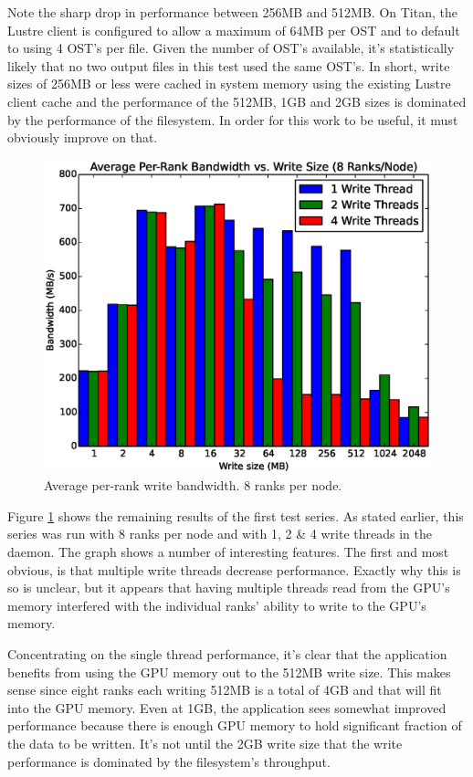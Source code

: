 Note the sharp drop in performance between 256MB and 512MB.  On Titan, the Lustre client is configured to allow a maximum of 64MB per OST and to default to using 4 OST's per file.  Given the number of OST's available, it's statistically likely that no two output files in this test used the same OST's.  In short, write sizes of 256MB or less were cached in system memory using the existing Lustre client cache and the performance of the 512MB, 1GB and 2GB sizes is dominated by the performance of the filesystem.  In order for this work to be useful, it must obviously improve on that.

\begin{figure}
\includegraphics[width=\linewidth]{figures/figure_2.eps}
\caption{Average per-rank write bandwidth.  8 ranks per node.} 
\label{fig:results_8_nobars}
\end{figure}

Figure \ref{fig:results_8_nobars} shows the remaining results of the first test series.  As stated earlier, this series was run with 8 ranks per node and with 1, 2 \& 4 write threads in the daemon.  The graph shows a number of interesting features.  The first and most obvious, is that multiple write threads decrease performance.  Exactly why this is so is unclear, but it appears that having multiple threads read from the GPU's memory interfered with the individual ranks' ability to write to the GPU's memory.  

Concentrating on the single thread performance, it's clear that the application benefits from using the GPU memory out to the 512MB write size.  This makes sense since eight ranks each writing 512MB is a total of 4GB and that will fit into the GPU memory.  Even at 1GB, the application sees somewhat improved performance because there is enough GPU memory to hold significant fraction of the data to be written.  It's not until the 2GB write size that the write performance is dominated by the filesystem's throughput.

